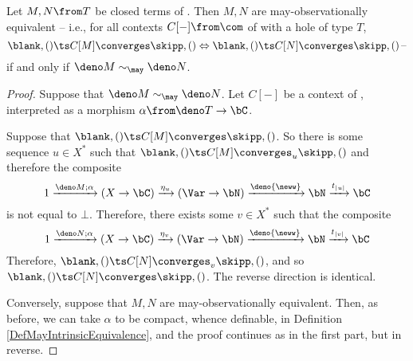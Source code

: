 \begin{theorem}
  Let $M,N\from T$ be closed terms of \IAX. Then $M,N$ are may-observationally equivalent -- i.e., for all contexts $C[-]\from \com$ of \IAX with a hole of type $T$, \[
    \blank,()\ts C[M] \converges \skipp,() \Leftrightarrow \blank,()\ts C[N] \converges \skipp,()\,\text{--}
    \]
  if and only if $\deno M \sim_{\may} \deno N$.
\end{theorem}
\begin{proof}
  Suppose that $\deno M\sim_{\may}\deno N$.  
  Let $C[-]$ be a context of \IAX, interpreted as a morphism $\alpha \from \deno T \to \bC$.

  Suppose that $\blank,()\ts C[M] \converges \skipp,()$.  
  So there is some sequence $u\in X^*$ such that $\blank,()\ts C[M] \converges_u \skipp,()$ and therefore the composite
  \[
    1 \xrightarrow{\deno M;\alpha}
    (X \to \bC) \xrightarrow{\eta_u}
    (\Var \to \bN) \xrightarrow{\deno{\neww}}
    \bN \xrightarrow{t_{|u|}}
    \bC
    \]
  is not equal to $\bot$.  
  Therefore, there exists some $v\in X^*$ such that the composite
  \[
    1 \xrightarrow{\deno N;\alpha}
    (X \to \bC) \xrightarrow{\eta_v}
    (\Var \to \bN) \xrightarrow{\deno{\neww}}
    \bN \xrightarrow{t_{|v|}}
    \bC
    \]
  Therefore, $\blank,()\ts C[N] \converges_v \skipp,()$, and so $\blank,()\ts C[N] \converges \skipp,()$.
  The reverse direction is identical.

  Conversely, suppose that $M,N$ are may-observationally equivalent.  
  Then, as before, we can take $\alpha$ to be compact, whence definable, in Definition \ref{DefMayIntrinsicEquivalence}, and the proof continues as in the first part, but in reverse.
\end{proof}

